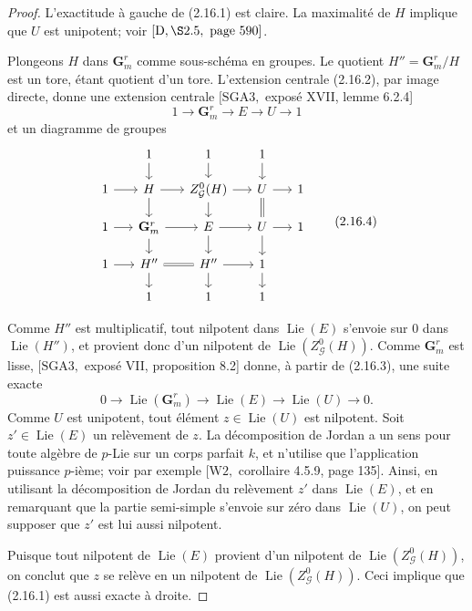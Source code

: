 \documentclass[11pt]{article}
\newcommand{\Lie}{\operatorname{Lie}}
\newcommand{\Gm}{\mathbf G_m}
\begin{document}
\begin{proof}
L'exactitude à gauche de (2.16.1) est claire. La maximalité de \(H\) implique que \(U\)
est unipotent; voir \([\mathrm D,\S2.5,\text{ page }590]\).

Plongeons \(H\) dans \(\Gm^r\) comme sous-schéma en groupes. Le quotient
\(H''=\Gm^r/H\) est un tore, étant quotient d'un tore. L'extension centrale (2.16.2),
par image directe, donne une extension centrale \([\mathrm{SGA3},\) exposé XVII, lemme
6.2.4]
\begin{equation}
1\longrightarrow\Gm^r\longrightarrow E\longrightarrow U\longrightarrow1
\tag{2.16.3}
\end{equation}
et un diagramme de groupes
\begin{equation}
\begin{tikzcd}[column sep=1.5em,row sep=1.2em]
 & 1 \arrow[d] & 1 \arrow[d] & 1 \arrow[d] & \\
1 \arrow[r] & H \arrow[r] \arrow[d] & Z^0_{\mathcal G}(H) \arrow[r] \arrow[d] & U \arrow[r] \arrow[d,equal] & 1 \\
1 \arrow[r] & \Gm^r \arrow[r] \arrow[d] & E \arrow[r] \arrow[d] & U \arrow[r] \arrow[d] & 1 \\
1 \arrow[r] & H'' \arrow[r,equal] \arrow[d] & H'' \arrow[r] \arrow[d] & 1 \arrow[d] & \\
 & 1 & 1 & 1 &
\end{tikzcd}
\tag{2.16.4}
\end{equation}

Comme \(H''\) est multiplicatif, tout nilpotent dans \(\Lie(E)\) s'envoie sur \(0\) dans
\(\Lie(H'')\), et provient donc d'un nilpotent de \(\Lie(Z^0_{\mathcal G}(H))\).
Comme \(\Gm^r\) est lisse, \([\mathrm{SGA3},\) exposé VII, proposition 8.2] donne, à
partir de (2.16.3), une suite exacte
\begin{equation}
0\longrightarrow\Lie(\Gm^r)\longrightarrow\Lie(E)\longrightarrow\Lie(U)
\longrightarrow0.
\tag{2.16.5}
\end{equation}
Comme \(U\) est unipotent, tout élément \(z\in\Lie(U)\) est nilpotent. Soit
\(z'\in\Lie(E)\) un relèvement de \(z\). La décomposition de Jordan a un sens pour toute
algèbre de \(p\)-Lie sur un corps parfait \(k\), et n'utilise que l'application puissance
\(p\)-ième; voir par exemple \([\mathrm{W2},\) corollaire 4.5.9, page 135]. Ainsi, en
utilisant la décomposition de Jordan du relèvement \(z'\) dans \(\Lie(E)\), et en
remarquant que la partie semi-simple s'envoie sur zéro dans \(\Lie(U)\), on peut supposer
que \(z'\) est lui aussi nilpotent.

Puisque tout nilpotent de \(\Lie(E)\) provient d'un nilpotent de
\(\Lie(Z^0_{\mathcal G}(H))\), on conclut que \(z\) se relève en un nilpotent de
\(\Lie(Z^0_{\mathcal G}(H))\). Ceci implique que (2.16.1) est aussi exacte à droite.
\end{proof}
\end{document}
